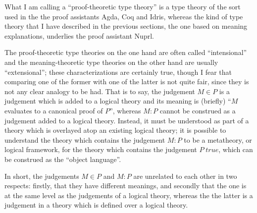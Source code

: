 \documentclass{amsart}
\theoremstyle{definition}
\theoremstyle{remark}
\numberwithin{equation}{section}
\newcommand\istrue[1]{\ensuremath{#1\;\mathit{true}}}
\newcommand\ver[2]{\ensuremath{#1\in#2}}
\begin{document}
What I am calling a ``proof-theoretic type theory'' is a type theory of the
sort used in the the proof assistants Agda, Coq and Idris, whereas the kind of
type theory that I have described in the previous sections, the one based on
meaning explanations, underlies the proof assistant Nuprl.

The proof-theoretic type theories on the one hand are often called
``intensional'' and the meaning-theoretic type theories on the other hand are
usually ``extensional''; these characterizations are certainly true, though I
fear that comparing one of the former with one of the latter is not quite fair,
since they is not any clear analogy to be had. That is to say, the judgement
\ver{M}{P} is a judgement which is added to a logical theory and its meaning is
(briefly) ``$M$ evaluates to a canonical proof of $P$'', whereas $M:P$ cannot
be construed as a judgement added to a logical theory. Instead, it must be
understood as part of a theory which is overlayed atop an existing logical
theory; it is possible to understand the theory which contains the judgement
$M:P$ to be a metatheory, or logical framework, for the theory which contains
the judgement \istrue{P}, which can be construed as the ``object language''.

In short, the judgements \ver{M}{P} and $M:P$ are unrelated to each other in
two respects: firstly, that they have different meanings, and secondly that the
one is at the same level as the judgements of a logical theory, whereas the the
latter is a judgement in a theory which is defined over a logical theory.
\end{document}
